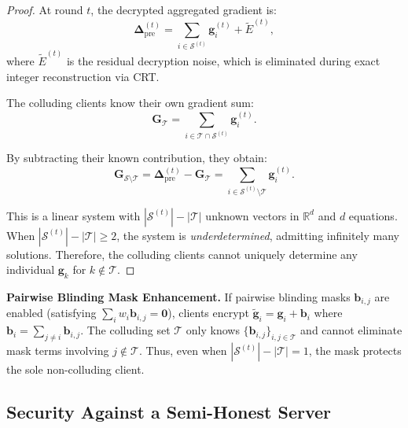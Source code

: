 \begin{proof}
At round $t$, the decrypted aggregated gradient is:
\begin{equation}
    \mathbf{\Delta}_{\mathrm{pre}}^{(t)} = \sum_{i \in \mathcal{S}^{(t)}} \mathbf{g}_i^{(t)} + \tilde{E}^{(t)},
\end{equation}
where $\tilde{E}^{(t)}$ is the residual decryption noise, which is eliminated during exact integer reconstruction via CRT.

The colluding clients know their own gradient sum:
\begin{equation}
    \mathbf{G}_{\mathcal{T}} = \sum_{i \in \mathcal{T} \cap \mathcal{S}^{(t)}} \mathbf{g}_i^{(t)}.
\end{equation}

By subtracting their known contribution, they obtain:
\begin{equation}
    \mathbf{G}_{\mathcal{S} \setminus \mathcal{T}} = \mathbf{\Delta}_{\mathrm{pre}}^{(t)} - \mathbf{G}_{\mathcal{T}} = \sum_{i \in \mathcal{S}^{(t)} \setminus \mathcal{T}} \mathbf{g}_i^{(t)}.
\end{equation}

This is a linear system with $|\mathcal{S}^{(t)}| - |\mathcal{T}|$ unknown vectors in $\mathbb{R}^d$ and $d$ equations. When $|\mathcal{S}^{(t)}| - |\mathcal{T}| \geq 2$, the system is \emph{underdetermined}, admitting infinitely many solutions. Therefore, the colluding clients cannot uniquely determine any individual $\mathbf{g}_k$ for $k \notin \mathcal{T}$.
\end{proof}

\noindent\textbf{Pairwise Blinding Mask Enhancement.}
If pairwise blinding masks $\mathbf{b}_{i,j}$ are enabled (satisfying $\sum_i w_i \mathbf{b}_{i,j} = \mathbf{0}$), clients encrypt $\tilde{\mathbf{g}}_i = \mathbf{g}_i + \mathbf{b}_i$ where $\mathbf{b}_i = \sum_{j \neq i} \mathbf{b}_{i,j}$. The colluding set $\mathcal{T}$ only knows $\{\mathbf{b}_{i,j}\}_{i,j \in \mathcal{T}}$ and cannot eliminate mask terms involving $j \notin \mathcal{T}$. Thus, even when $|\mathcal{S}^{(t)}| - |\mathcal{T}| = 1$, the mask protects the sole non-colluding client.

\subsection{Security Against a Semi-Honest Server}
\label{ssec:semi-honest-server}

